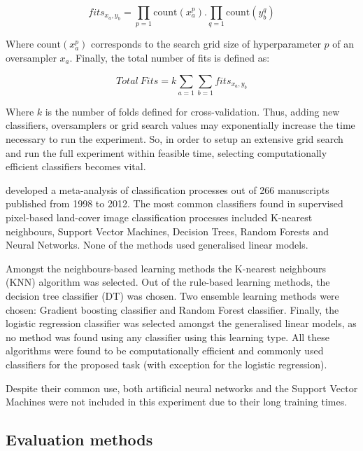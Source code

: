 \documentclass[parskip=full]{scrartcl}
\begin{document}
\[
fits_{x_a,y_b}=\prod\limits_{p=1} \textrm{count}(x_a^p).\prod\limits_{q=1}
\textrm{count}(y_b^q)
\]

Where $\textrm{count}(x_a^p)$ corresponds to the search grid size of
hyperparameter $p$ of an oversampler $x_a$. Finally, the total number of fits
is defined as:

\[
Total\ Fits=k\sum\limits_{a=1} \sum\limits_{b=1} fits_{x_a,y_b}
\]

Where $k$ is the number of folds defined for cross-validation. Thus, adding new
classifiers, oversamplers or grid search values may exponentially increase the
time necessary to run the experiment. So, in order to setup an extensive grid
search and run the full experiment within feasible time, selecting
computationally efficient classifiers becomes vital.

\cite{Khatami2016} developed a meta-analysis of classification processes out
of 266 manuscripts published from 1998 to 2012. The most common classifiers
found in supervised pixel-based land-cover image classification processes
included K-nearest neighbours, Support Vector Machines, Decision Trees, Random
Forests and Neural Networks. None of the methods used generalised linear models.

Amongst the neighbours-based learning methods the K-nearest neighbours (KNN)
 algorithm was selected. Out of the rule-based learning
methods, the decision tree classifier (DT)  was chosen.
Two ensemble learning methods were chosen: Gradient boosting classifier
 and Random Forest classifier. Finally, the logistic
regression classifier  was selected amongst the
generalised linear models, as no method was found using any classifier using
this learning type. All these algorithms were found to be computationally
efficient and commonly used classifiers for the proposed task (with exception
for the logistic regression).

Despite their common use, both artificial neural networks and the Support
Vector Machines were not included in this experiment due to their long training
times.

\subsection{Evaluation methods}
\end{document}
